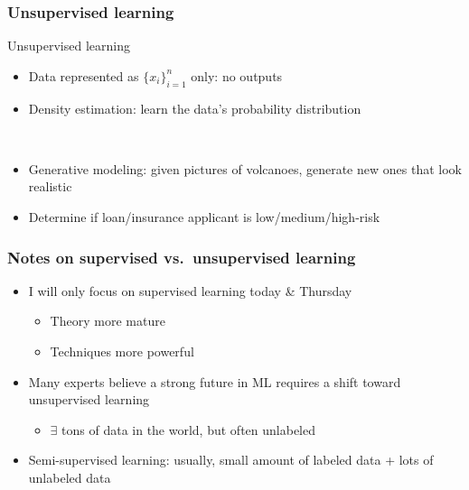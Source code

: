 \begin{frame}
    \frametitle{Unsupervised learning}
    \begin{block}{Unsupervised learning}
        \begin{itemize}
            \item Data represented as $\{x_i\}_{i=1}^n$ only: no outputs
            \item \alert{Density estimation}: learn the data's probability distribution
        \end{itemize}
    \end{block}

     \\[1ex]

    \begin{itemize}
        \item<4-> Generative modeling: given pictures of volcanoes, generate new ones that look realistic
        \item<5-> Determine if loan/insurance applicant is low/medium/high-risk
    \end{itemize}

\end{frame}

\begin{frame}
    \frametitle{Notes on supervised vs.~unsupervised learning}

    \begin{itemize}
        \item I will only focus on supervised learning today \& Thursday
        \begin{itemize}
            \item Theory more mature
            \item Techniques more powerful
        \end{itemize}
        \item Many experts believe a strong future in ML requires a shift toward unsupervised learning
        \begin{itemize}
            \item $\exists$ tons of data in the world, but often unlabeled
        \end{itemize}
        \item Semi-supervised learning: usually, small amount of labeled data + lots of unlabeled data
    \end{itemize}
\end{frame}

